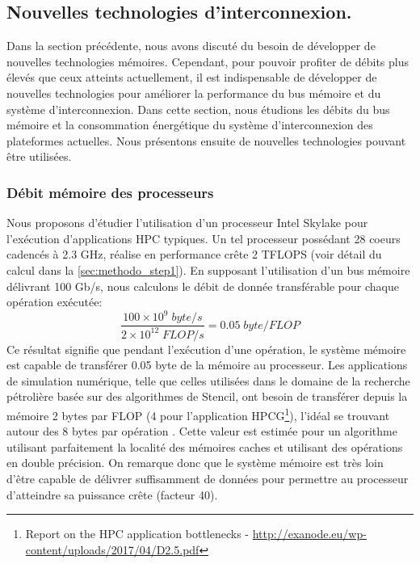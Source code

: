         
        



\newpage


\subsection{Nouvelles technologies d'interconnexion.}

    Dans la section précédente, nous avons discuté du besoin de développer de nouvelles technologies mémoires. Cependant, pour pouvoir profiter de débits plus élevés que ceux atteints actuellement, il est indispensable de développer de nouvelles technologies pour améliorer la performance du bus mémoire et du système d'interconnexion. Dans cette section, nous étudions les débits du bus mémoire et la consommation énergétique du système d'interconnexion des plateformes actuelles. Nous présentons ensuite de nouvelles technologies pouvant être utilisées. 

    \subsubsection{Débit mémoire des processeurs} 
        
        Nous proposons d'étudier l'utilisation d'un processeur Intel Skylake pour l'exécution d'applications HPC typiques. Un tel processeur possédant 28 coeurs cadencés à 2.3 GHz, réalise en performance crête 2 TFLOPS (voir détail du calcul dans la \autoref{sec:methodo_step1}). En supposant l'utilisation d'un bus mémoire délivrant 100 Gb/s, nous calculons le débit de donnée transférable pour chaque opération exécutée:
        \begin{equation}
            \frac{100 \times 10^9 \; byte/s}{2 \times 10^{12} \; FLOP/s} = 0.05 \; byte/FLOP
        \end{equation}
        Ce résultat signifie que pendant l'exécution d'une opération, le système mémoire est capable de transférer 0.05 byte de la mémoire au processeur. Les applications de simulation numérique, telle que celles utilisées dans le domaine de la recherche pétrolière basée sur des algorithmes de Stencil, ont besoin de transférer depuis la mémoire 2 bytes par FLOP (4 pour l'application HPCG\footnote{Report on the HPC application bottlenecks - \url{http://exanode.eu/wp-content/uploads/2017/04/D2.5.pdf}}), l'idéal se trouvant autour des 8 bytes par opération \cite{Bergman2015}. Cette valeur est estimée pour un algorithme utilisant parfaitement la localité des mémoires caches et utilisant des opérations en double précision. On remarque donc que le système mémoire est très loin d'être capable de délivrer suffisamment de données pour permettre au processeur d'atteindre sa puissance crête (facteur 40). 
        
